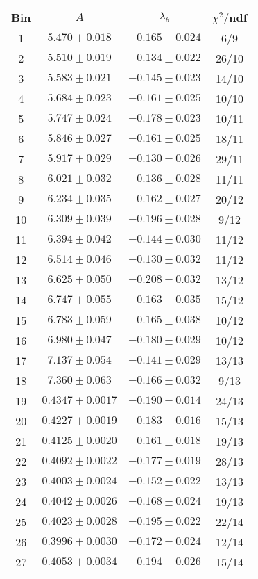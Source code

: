 \begin{tabular}{c|c|c|c}
Bin & $A$ & $\lambda_\theta$ & $\chi^2/$ndf \\
\hline
1 & $5.470\pm0.018$ & $-0.165\pm0.024$ & 6/9 \\
2 & $5.510\pm0.019$ & $-0.134\pm0.022$ & 26/10 \\
3 & $5.583\pm0.021$ & $-0.145\pm0.023$ & 14/10 \\
4 & $5.684\pm0.023$ & $-0.161\pm0.025$ & 10/10 \\
5 & $5.747\pm0.024$ & $-0.178\pm0.023$ & 10/11 \\
6 & $5.846\pm0.027$ & $-0.161\pm0.025$ & 18/11 \\
7 & $5.917\pm0.029$ & $-0.130\pm0.026$ & 29/11 \\
8 & $6.021\pm0.032$ & $-0.136\pm0.028$ & 11/11 \\
9 & $6.234\pm0.035$ & $-0.162\pm0.027$ & 20/12 \\
10 & $6.309\pm0.039$ & $-0.196\pm0.028$ & 9/12 \\
11 & $6.394\pm0.042$ & $-0.144\pm0.030$ & 11/12 \\
12 & $6.514\pm0.046$ & $-0.130\pm0.032$ & 11/12 \\
13 & $6.625\pm0.050$ & $-0.208\pm0.032$ & 13/12 \\
14 & $6.747\pm0.055$ & $-0.163\pm0.035$ & 15/12 \\
15 & $6.783\pm0.059$ & $-0.165\pm0.038$ & 10/12 \\
16 & $6.980\pm0.047$ & $-0.180\pm0.029$ & 10/12 \\
17 & $7.137\pm0.054$ & $-0.141\pm0.029$ & 13/13 \\
18 & $7.360\pm0.063$ & $-0.166\pm0.032$ & 9/13 \\
19 & $0.4347\pm0.0017$ & $-0.190\pm0.014$ & 24/13 \\
20 & $0.4227\pm0.0019$ & $-0.183\pm0.016$ & 15/13 \\
21 & $0.4125\pm0.0020$ & $-0.161\pm0.018$ & 19/13 \\
22 & $0.4092\pm0.0022$ & $-0.177\pm0.019$ & 28/13 \\
23 & $0.4003\pm0.0024$ & $-0.152\pm0.022$ & 13/13 \\
24 & $0.4042\pm0.0026$ & $-0.168\pm0.024$ & 19/13 \\
25 & $0.4023\pm0.0028$ & $-0.195\pm0.022$ & 22/14 \\
26 & $0.3996\pm0.0030$ & $-0.172\pm0.024$ & 12/14 \\
27 & $0.4053\pm0.0034$ & $-0.194\pm0.026$ & 15/14 \\

\end{tabular}
